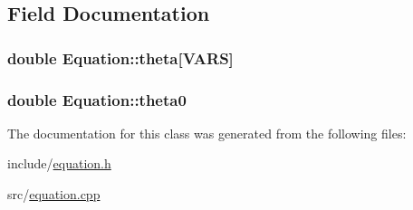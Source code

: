\subsection{Field Documentation}
\subsubsection[{theta}]{\setlength{\rightskip}{0pt plus 5cm}double Equation\+::theta\mbox{[}{\bf V\+A\+RS}\mbox{]}}\hypertarget{classEquation_af346bba0364be7c84ebc969061d0315f}{}\label{classEquation_af346bba0364be7c84ebc969061d0315f}
\subsubsection[{theta0}]{\setlength{\rightskip}{0pt plus 5cm}double Equation\+::theta0}\hypertarget{classEquation_aa3da62783d229956703741c758b6fd69}{}\label{classEquation_aa3da62783d229956703741c758b6fd69}


The documentation for this class was generated from the following files\+:\begin{DoxyCompactItemize}
\item 
include/\hyperlink{equation_8h}{equation.\+h}\item 
src/\hyperlink{equation_8cpp}{equation.\+cpp}\end{DoxyCompactItemize}

